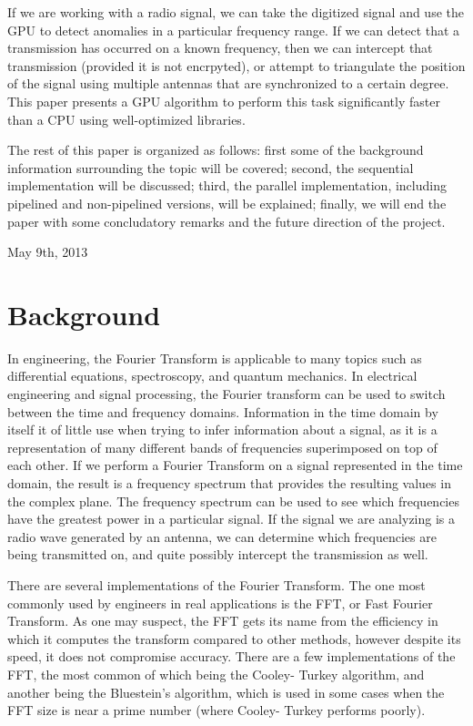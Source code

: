 \documentclass[conference]{IEEEtran}
\begin{document}
If we are working with a radio signal, we can take the digitized signal and
use the GPU to detect anomalies in a particular frequency range. If we can
detect that a transmission has occurred on a known frequency, then we can
intercept that transmission (provided it is not encrpyted), or attempt
to triangulate the position of the signal using multiple antennas that
are synchronized to a certain degree. This paper presents a GPU algorithm
to perform this task significantly faster than a CPU using well-optimized
libraries.

The rest of this paper is organized as follows: first some of the background
information surrounding the topic will be covered; second, the sequential implementation
will be discussed; third, the parallel implementation, including pipelined and
non-pipelined versions, will be explained; finally, we will end the paper
with some concludatory remarks and the future direction of the project.
 
\hfill May 9th, 2013

\section{Background}

In engineering, the Fourier Transform is applicable to many topics such as 
differential equations, spectroscopy, and quantum mechanics. In electrical
engineering and signal processing, the Fourier transform can be used to
switch between the time and frequency domains. Information in the time
domain by itself it of little use when trying to infer information about
a signal, as it is a representation of many different bands of frequencies
superimposed on top of each other. If we perform a Fourier Transform on 
a signal represented in the time domain, the result is a frequency spectrum
that provides the resulting values in the complex plane. The frequency
spectrum can be used to see which frequencies have the greatest power
in a particular signal. If the signal we are analyzing is a radio wave
generated by an antenna, we can determine which frequencies are being
transmitted on, and quite possibly intercept the transmission as well.

There are several implementations of the Fourier Transform. The one most
commonly used by engineers in real applications is the FFT, or Fast
Fourier Transform. As one may suspect, the FFT gets its name from the
efficiency in which it computes the transform compared to other methods,
however despite its speed, it does not compromise accuracy. There are a 
few implementations of the FFT, the most common of which being the Cooley-
Turkey algorithm, and another being the Bluestein's algorithm, which is
used in some cases when the FFT size is near a prime number (where Cooley-
Turkey performs poorly). 
\end{document}
